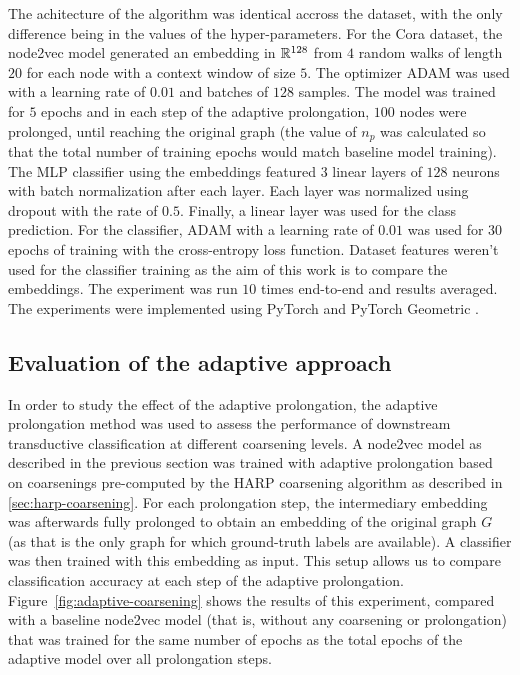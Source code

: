 The achitecture of the algorithm was identical accross the dataset, with the only difference being in the values of the hyper-parameters. For the Cora dataset, the node2vec model generated an embedding in \( \mathbb{R}^{128} \) from \( 4 \) random walks of length \( 20 \) for each node with a context window of size \( 5 \). The optimizer ADAM \cite{kingma_adam:_2017} was used with a learning rate of \( 0.01 \) and batches of \( 128 \) samples. The model was trained for \( 5 \) epochs and in each step of the adaptive prolongation, \( 100 \) nodes were prolonged, until reaching the original graph (the value of \( n_p \) was calculated so that the total number of training epochs would match baseline model training). The MLP classifier using the embeddings featured \( 3 \) linear layers of \( 128 \) neurons with batch normalization after each layer. Each layer was normalized using dropout \cite{srivastava_dropout_2014} with the rate of \( 0.5 \). Finally, a linear layer was used for the class prediction. For the classifier, ADAM with a learning rate of \( 0.01 \) was used for \( 30 \) epochs of training with the cross-entropy loss function. Dataset features weren't used for the classifier training as the aim of this work is to compare the embeddings. The experiment was run \( 10 \) times end-to-end and results averaged. The experiments were implemented using PyTorch \cite{paszke_pytorch_2019} and PyTorch Geometric \cite{fey_fast_2019}.

\subsection{Evaluation of the adaptive approach}\label{sec:adaptive-experiments}

In order to study the effect of the adaptive prolongation, the adaptive prolongation method was used to assess the performance of downstream transductive classification at different coarsening levels. A node2vec model as described in the previous section was trained with adaptive prolongation based on coarsenings pre-computed by the HARP coarsening algorithm as described in \ref{sec:harp-coarsening}. For each prolongation step, the intermediary embedding was afterwards fully prolonged to obtain an embedding of the original graph \( G \) (as that is the only graph for which ground-truth labels are available). A classifier was then trained with this embedding as input. This setup allows us to compare classification accuracy at each step of the adaptive prolongation. Figure~\ref{fig:adaptive-coarsening} shows the results of this experiment, compared with a baseline node2vec model (that is, without any coarsening or prolongation) that was trained for the same number of epochs as the total epochs of the adaptive model over all prolongation steps.

